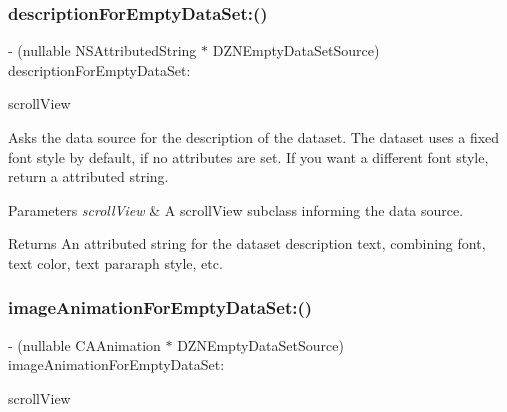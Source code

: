 \subsubsection{\texorpdfstring{description\+For\+Empty\+Data\+Set\+:()}{descriptionForEmptyDataSet:()}}
{\footnotesize\ttfamily -\/ (nullable N\+S\+Attributed\+String $\ast$ D\+Z\+N\+Empty\+Data\+Set\+Source) description\+For\+Empty\+Data\+Set\+: \begin{DoxyParamCaption}\item[{(U\+I\+Scroll\+View $\ast$)}]{scroll\+View }\end{DoxyParamCaption}\hspace{0.3cm}{\ttfamily [optional]}}

Asks the data source for the description of the dataset. The dataset uses a fixed font style by default, if no attributes are set. If you want a different font style, return a attributed string.


\begin{DoxyParams}{Parameters}
{\em scroll\+View} & A scroll\+View subclass informing the data source. \\
\hline
\end{DoxyParams}
\begin{DoxyReturn}{Returns}
An attributed string for the dataset description text, combining font, text color, text pararaph style, etc. 
\end{DoxyReturn}
\mbox{\label{protocol_d_z_n_empty_data_set_source_01-p_a2af10188f09fbac8ce42eb40554d78fc}} 
\subsubsection{\texorpdfstring{image\+Animation\+For\+Empty\+Data\+Set\+:()}{imageAnimationForEmptyDataSet:()}}
{\footnotesize\ttfamily -\/ (nullable C\+A\+Animation $\ast$ D\+Z\+N\+Empty\+Data\+Set\+Source) image\+Animation\+For\+Empty\+Data\+Set\+: \begin{DoxyParamCaption}\item[{(U\+I\+Scroll\+View $\ast$)}]{scroll\+View }\end{DoxyParamCaption}\hspace{0.3cm}{\ttfamily [optional]}}

